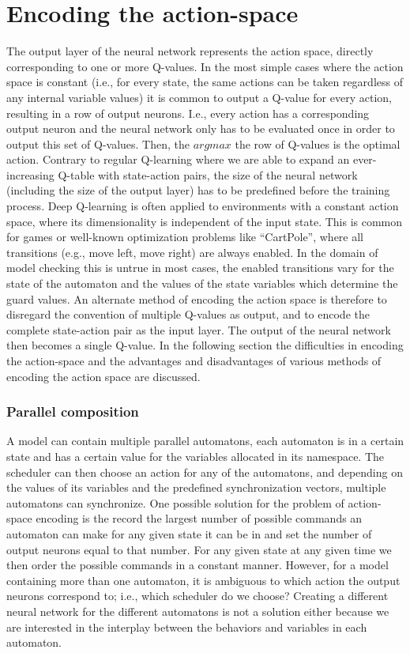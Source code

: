 \section{Encoding the action-space}
The output layer of the neural network represents the action space, directly corresponding to one or more Q-values. In the most simple cases where the action space is constant (i.e., for every state, the same actions can be taken regardless of any internal variable values) it is common to output a Q-value for every action, resulting in a row of output neurons. I.e., every action has a corresponding output neuron and the neural network only has to be evaluated once in order to output this set of Q-values. Then, the $argmax$ the row of Q-values is the optimal action.
Contrary to regular Q-learning where we are able to expand an ever-increasing Q-table with state-action pairs, the size of the neural network (including the size of the output layer) has to be predefined before the training process. Deep Q-learning is often applied to environments with a constant action space, where its dimensionality is independent of the input state. This is common for games or well-known optimization problems like ``CartPole'', where all transitions (e.g., move left, move right) are always enabled. In the domain of model checking this is untrue in most cases, the enabled transitions vary for the state of the automaton and the values of the state variables which determine the guard values. An alternate method of encoding the action space is therefore to disregard the convention of multiple Q-values as output, and to encode the complete state-action pair as the input layer. The output of the neural network then becomes a single Q-value. In the following section the difficulties in encoding the action-space and the advantages and disadvantages of various methods of encoding the action space are discussed.

\subsubsection{Parallel composition}
A model can contain multiple parallel automatons, each automaton is in a certain state and has a certain value for the variables allocated in its namespace. The scheduler can then choose an action for any of the automatons, and depending on the values of its variables and the predefined synchronization vectors, multiple automatons can synchronize. One possible solution for the problem of action-space encoding is the record the largest number of possible commands an automaton can make for any given state it can be in and set the number of output neurons equal to that number. For any given state at any given time we then order the possible commands in a constant manner. However, for a model containing more than one automaton, it is ambiguous to which action the output neurons correspond to; i.e., which scheduler do we choose? Creating a different neural network for the different automatons is not a solution either because we are interested in the interplay between the behaviors and variables in each automaton.

